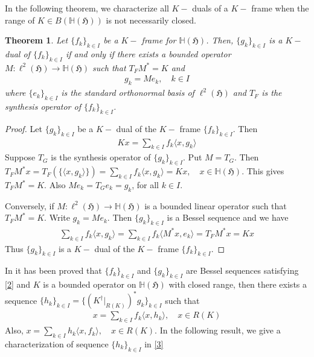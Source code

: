 \documentclass[a4paper,12pt,reqno]{amsart}
\theoremstyle{plain}
\newtheorem{theorem}{\bf Theorem}[section]
\theoremstyle{remark}
\begin{document}
	In the following theorem, we characterize all $K-$ duals of a $K-$ frame when the range of $K \in B(\mathbb{H}(\mathfrak{H}))$ is not necessarily  closed.
	
	\begin{theorem}
		Let $\{f_k\}_{k\in I}$ be a $K-$ frame for $\mathbb{H}(\mathfrak{H})$. Then, $\{g_k\}_{k \in I}$ is a $K-$ dual of $\{f_k\}_{k\in I}$ if and only if there exists a bounded operator $M:\ell ^2(\mathfrak{H}) \to  \mathbb{H}(\mathfrak{H})$ such that $T_FM^*=K$ and 
		\begin{align*}
			g_k=Me_k, \quad k \in I
		\end{align*}
		where $\{e_k\}_{k \in I}$ is the standard orthonormal basis of $\ell ^2(\mathfrak{H})$ and $T_F$ is the synthesis operator of $\{f_k\}_{k\in I}$.
		
	\end{theorem}
	
	\begin{proof}
		Let $\{g_k\}_{k\in I}$ be a $K-$ dual of the $K-$ frame $\{f_k\}_{k\in I}$. Then 
		\begin{align*}
			Kx=\sum_{k\in I}f_k\langle x, g_k\rangle 
		\end{align*}
		Suppose $T_G$ is the synthesis operator of $\{g_k\}_{k\in I}$. Put $M=T_G$. Then $T_FM^*x=T_F(\{\langle x, g_k\rangle\})=\sum_{k \in I}f_k \langle x, g_k\rangle= Kx,\quad x\in \mathbb{H}(\mathfrak{H}) $. This gives $T_FM^*=K$. Also $Me_k=T_Ge_k=g_k$, for all $k\in I$.  
		
		Conversely, if $M:\ell ^2(\mathfrak{H}) \to  \mathbb{H}(\mathfrak{H})$ is a bounded linear operator such that $T_FM^*=K$.  Write $g_k=Me_k$. Then $\{g_k\}_{k\in I}$ is a Bessel sequence and we have 
		\begin{align*}
			\sum_{k \in I}f_k\langle x, g_k\rangle=\sum_{k \in I}f_k\langle M^*x, e_k\rangle=T_FM^*x=Kx 
		\end{align*}
		Thus $\{g_k\}_{k\in I}$ is a $K-$ dual of the $K-$ frame $\{f_k\}_{k\in I}$.
	\end{proof}
	
	
	In \cite{g} it has been proved that $\{f_k\}_{k\in I}$ and $\{g_k\}_{k\in I}$ are Bessel sequences satisfying \eqref{2} and $K$ is a bounded operator on $\mathbb{H}(\mathfrak{H})$ with closed range, then there exists a sequence $\{h_k\}_{k\in I}=\{(K^{\dagger}|_{R(K)})^*g_k\}_{k\in I}$ 
	such that 
	\begin{align}\label{3}
		x= \sum_{k\in I}f_k\langle x,h_k\rangle, \quad  x\in R(K) 
	\end{align}
	Also, $x= \sum_{k\in I}h_k\langle x,f_k\rangle, \quad  x\in R(K) $. In the following result, we give a characterization of sequence $\{h_k\}_{k\in I}$ in \eqref{3}
	
\end{document}
